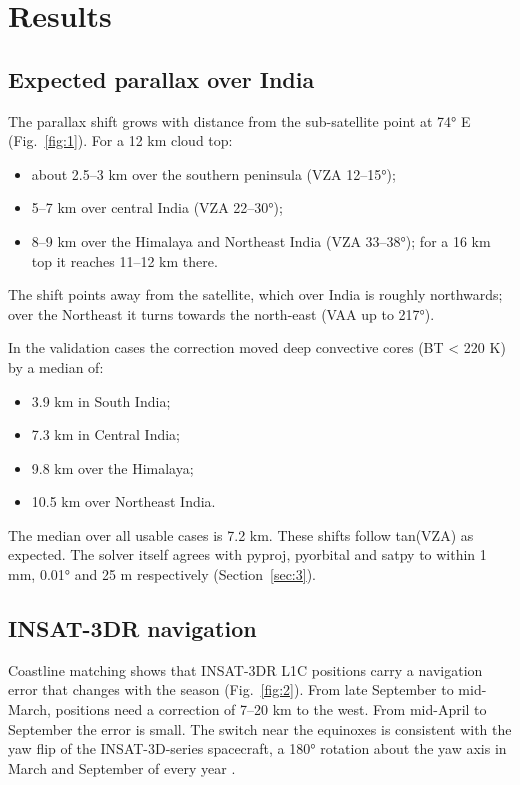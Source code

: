 \section{Results}
\label{sec:results}
\label{sec:5}

\subsection{Expected parallax over India}\label{sec:5.1}

The parallax shift grows with distance from the sub-satellite point at 74° E (Fig.~\ref{fig:1}). For a 12 km cloud top:

\begin{itemize}
\tightlist
\item
  about 2.5--3 km over the southern peninsula (VZA 12--15°);
\item
  5--7 km over central India (VZA 22--30°);
\item
  8--9 km over the Himalaya and Northeast India (VZA 33--38°); for a 16 km top it reaches 11--12 km there.
\end{itemize}

The shift points away from the satellite, which over India is roughly northwards; over the Northeast it turns towards the north-east (VAA up to 217°).

In the validation cases the correction moved deep convective cores (BT \textless{} 220 K) by a median of:

\begin{itemize}
\tightlist
\item
  3.9 km in South India;
\item
  7.3 km in Central India;
\item
  9.8 km over the Himalaya;
\item
  10.5 km over Northeast India.
\end{itemize}

The median over all usable cases is 7.2 km. These shifts follow tan(VZA) as expected. The solver itself agrees with pyproj, pyorbital and satpy to within 1 mm, 0.01° and 25 m respectively (Section~\ref{sec:3}).

\subsection{INSAT-3DR navigation}\label{sec:5.2}

Coastline matching shows that INSAT-3DR L1C positions carry a navigation error that changes with the season (Fig.~\ref{fig:2}). From late September to mid-March, positions need a correction of 7--20 km to the west. From mid-April to September the error is small. The switch near the equinoxes is consistent with the yaw flip of the INSAT-3D-series spacecraft, a 180° rotation about the yaw axis in March and September of every year \citep{prakash2014}.

